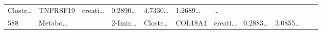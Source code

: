 \documentclass[
]{article}
\begin{document}
\begin{longtable}[]{@{}lllllllllll@{}}
\begin{minipage}[t]{0.07\columnwidth}
Clostr\ldots{}\strut
\end{minipage} & \begin{minipage}[t]{0.07\columnwidth}\raggedright
TNFRSF19\strut
\end{minipage} & \begin{minipage}[t]{0.09\columnwidth}\raggedright
creati\ldots{}\strut
\end{minipage} & \begin{minipage}[t]{0.07\columnwidth}\raggedright
0.2890\ldots{}\strut
\end{minipage} & \begin{minipage}[t]{0.07\columnwidth}\raggedright
4.7330\ldots{}\strut
\end{minipage} & \begin{minipage}[t]{0.07\columnwidth}\raggedright
1.2689\ldots{}\strut
\end{minipage} & \begin{minipage}[t]{0.03\columnwidth}\raggedright
\ldots{}\strut
\end{minipage}\tabularnewline
\begin{minipage}[t]{0.03\columnwidth}\raggedright
588\strut
\end{minipage} & \begin{minipage}[t]{0.07\columnwidth}\raggedright
Metabo\ldots{}\strut
\end{minipage} & \begin{minipage}[t]{0.07\columnwidth}\raggedright
\strut
\end{minipage} & \begin{minipage}[t]{0.09\columnwidth}\raggedright
2-Imin\ldots{}\strut
\end{minipage} & \begin{minipage}[t]{0.07\columnwidth}\raggedright
Clostr\ldots{}\strut
\end{minipage} & \begin{minipage}[t]{0.07\columnwidth}\raggedright
COL18A1\strut
\end{minipage} & \begin{minipage}[t]{0.09\columnwidth}\raggedright
creati\ldots{}\strut
\end{minipage} & \begin{minipage}[t]{0.07\columnwidth}\raggedright
0.2883\ldots{}\strut
\end{minipage} & \begin{minipage}[t]{0.07\columnwidth}\raggedright
3.0855\ldots{}\strut
\end{minipage} & \begin{minipage}[t]{0.07\columnwidth}\raggedright

\end{minipage}
\end{longtable}
\end{document}
